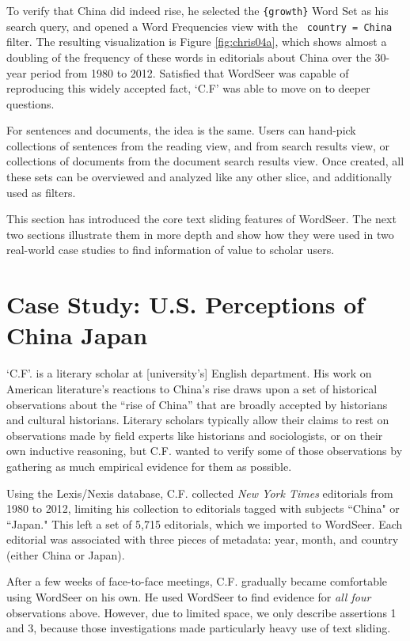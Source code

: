 \documentclass{sig-alternate}
\newcommand{\code}[1] {\texttt{#1}}
\begin{document}
To verify that China did indeed rise, he selected the  \code{\{growth\}} Word Set as his search query, and opened a Word Frequencies view with the  \code{ country = China} filter. The resulting visualization is Figure \ref{fig:chris04a}, which shows almost a doubling of the frequency of these words in editorials about China over the 30-year period from 1980 to 2012. Satisfied that WordSeer was capable of reproducing this widely accepted fact, `C.F' was able to move on to deeper questions.

For sentences and documents, the idea is the same.  Users can hand-pick collections of sentences from the reading view, and from search results view, or collections of documents from the document search results view.  Once created, all these sets can be overviewed and analyzed like any other slice, and additionally used as filters.

This section has introduced the core text sliding features of WordSeer.  The next two sections illustrate them in more depth and show how they were used in two real-world case studies to find information of value to scholar users.

\section{Case Study: U.S. Perceptions of\\China Japan}

 `C.F'. is a literary scholar at [university's] English department. His work on American literature's reactions to China's rise draws upon a set of historical observations about the ``rise of China'' that are broadly accepted by historians and cultural historians. Literary scholars typically allow their claims to rest on observations made by field experts like historians and sociologists, or on their own inductive reasoning, but C.F. wanted to verify some of those observations by gathering as much empirical evidence for them as possible. 
 
Using the Lexis/Nexis database, C.F. collected \emph{New York Times} editorials from 1980 to 2012, limiting his collection to editorials tagged with subjects ``China" or ``Japan." This left a set of 5,715 editorials, which we imported to WordSeer. Each editorial was associated with three pieces of metadata: year, month, and country (either China or Japan).

After a few weeks of face-to-face meetings, C.F. gradually became comfortable using WordSeer on his own.  He used WordSeer to find evidence for \emph{all four} observations above. However, due to limited space, we only describe assertions 1 and 3, because those investigations made particularly heavy use of text sliding.
\end{document}
